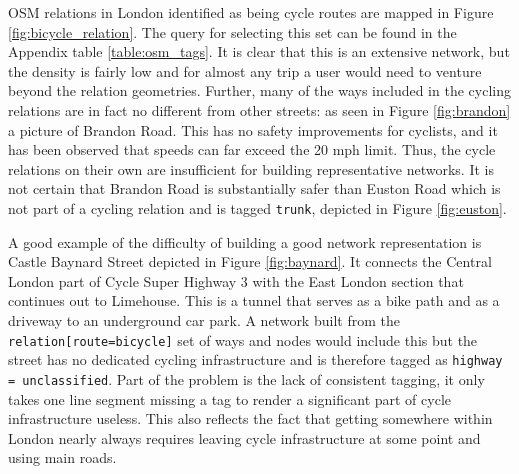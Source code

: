 OSM relations in London identified as being cycle routes are mapped in Figure \ref{fig:bicycle_relation}. The query for selecting this set can be found in the Appendix table \ref{table:osm_tags}. It is clear that this is an extensive network, but the density is fairly low and for almost any trip a user would need to venture beyond the relation geometries. Further, many of the ways included in the cycling relations are in fact no different from other streets: as seen in Figure \ref{fig:brandon} a picture of Brandon Road. This has no safety improvements for cyclists, and it has been observed that speeds can far exceed the 20 mph limit. Thus, the cycle relations on their own are insufficient for building representative networks. It is not certain that Brandon Road is substantially safer than Euston Road which is not part of a cycling relation and is tagged \texttt{trunk}, depicted in Figure \ref{fig:euston}. 

A good example of the difficulty of building a good network representation is Castle Baynard Street depicted in Figure \ref{fig:baynard}. It connects the Central London part of Cycle Super Highway 3 with the East London section that continues out to Limehouse. This is a tunnel that serves as a bike path and as a driveway to an underground car park. A network built from the \texttt{relation[route=bicycle]} set of ways and nodes would include this but the street has no dedicated cycling infrastructure and is therefore tagged as \texttt{highway = unclassified}. Part of the problem is the lack of consistent tagging, it only takes one line segment missing a tag to render a significant part of cycle infrastructure useless. This also reflects the fact that getting somewhere within London nearly always requires leaving cycle infrastructure at some point and using main roads.

